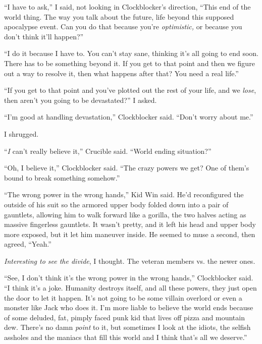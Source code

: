 ``I have to ask,'' I said, not looking in Clockblocker's direction, ``This end of the world thing.  The way you talk about the future, life beyond this supposed apocalypse event.  Can you do that because you're \emph{optimistic,  }or because you don't think it'll happen?''



``I do it because I have to.  You can't stay sane, thinking it's all going to end soon.  There has to be something beyond it.  If you get to that point and then we figure out a way to resolve it, then what happens after that?  You need a real life.''



``If you get to that point and you've plotted out the rest of your life, and we \emph{lose}, then aren't you going to be devastated?'' I asked.



``I'm good at handling devastation,'' Clockblocker said.  ``Don't worry about me.''



I shrugged.



``\emph{I} can't really believe it,'' Crucible said.  ``World ending situation?''



``Oh, I believe it,'' Clockblocker said.  ``The crazy powers we get?  One of them's bound to break something somehow.''



``The wrong power in the wrong hands,'' Kid Win said.  He'd reconfigured the outside of his suit so the armored upper body folded down into a pair of gauntlets, allowing him to walk forward like a gorilla, the two halves acting as massive fingerless gauntlets.  It wasn't pretty, and it left his head and upper body more exposed, but it let him maneuver inside.  He seemed to muse a second, then agreed, ``Yeah.''



\emph{Interesting to see the divide}, I thought.  The veteran members vs. the newer ones.



``See, I don't think it's the wrong power in the wrong hands,'' Clockblocker said.  ``I think it's a joke.  Humanity destroys itself, and all these powers, they just open the door to let it happen.  It's not going to be some villain overlord or even a monster like Jack who does it.   I'm more liable to believe the world ends because of some deluded, fat, pimply faced punk kid that lives off pizza and mountain dew.  There's no damn \emph{point} to it, but sometimes I look at the idiots, the selfish assholes and the maniacs that fill this world and I think that's all we deserve.''



